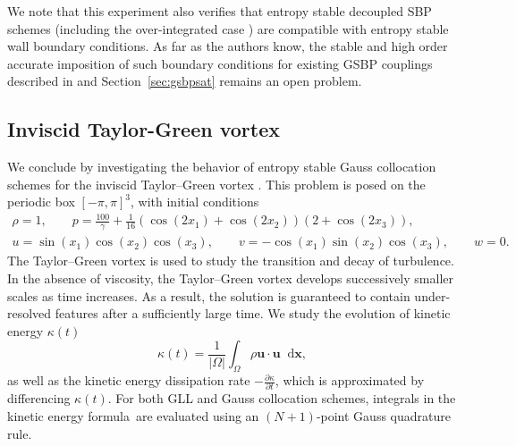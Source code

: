 \documentclass[onefignum,onetabnum,final]{siamart171218}
\newcommand{\pd}[2]{\frac{\partial#1}{\partial#2}}
\newcommand{\LRp}[1]{\left( #1 \right)}
\newcommand{\LRb}[1]{\left| #1 \right|}
\newcommand*\diff[1]{\mathop{}\!{\mathrm{d}#1}}
\begin{document}
We note that this experiment also verifies that entropy stable decoupled SBP schemes (including the over-integrated case \cite{chan2017discretely}) are compatible with entropy stable wall boundary conditions.  As far as the authors know, the stable and high order accurate imposition of such boundary conditions for existing GSBP couplings described in \cite{crean2017high} and Section~\ref{sec:gsbpsat} remains an open problem.  

\subsection{Inviscid Taylor-Green vortex}

We conclude by investigating the behavior of entropy stable Gauss collocation schemes for the inviscid Taylor--Green vortex \cite{ae1937mechanism, gassner2016split, crean2018entropy}.  This problem is posed on the periodic box $[-\pi,\pi]^3$, with initial conditions 
\begin{gather*}
\rho = 1, \qquad p = \frac{100}{\gamma} + \frac{1}{16} \LRp{\cos(2x_1) + \cos(2x_2)}\LRp{2+\cos(2x_3)},\\
u = \sin(x_1)\cos(x_2)\cos(x_3), \qquad
v = -\cos(x_1)\sin(x_2)\cos(x_3),\qquad
w= 0.
\end{gather*}
The Taylor--Green vortex is used to study the transition and decay of turbulence.  In the absence of viscosity, the Taylor--Green vortex develops successively smaller scales as time increases.  As a result, the solution is guaranteed to contain under-resolved features after a sufficiently large time.  We study the evolution of kinetic energy $\kappa(t)$ 
\[
\kappa(t) =\frac{1}{\LRb{\Omega}} \int_{\Omega} \rho \bm{u}\cdot\bm{u} \diff{\bm{x}},
\]
as well as the kinetic energy dissipation rate $-\pd{\kappa}{t}$, which is approximated by differencing $\kappa(t)$.  For both GLL and Gauss collocation schemes, integrals in the kinetic energy formula are evaluated using an $(N+1)$-point Gauss quadrature rule.
\end{document}
